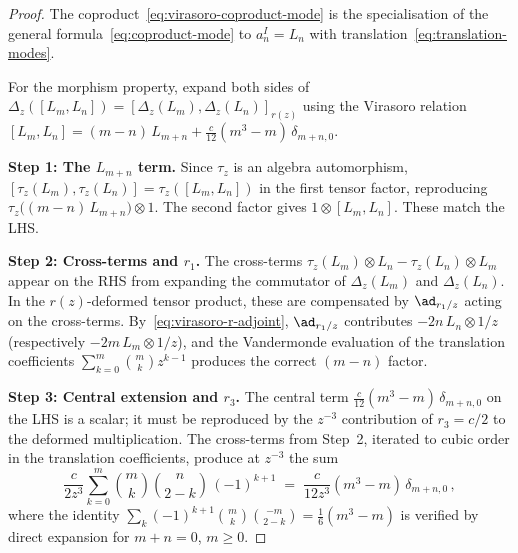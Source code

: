 \begin{proof}
The coproduct~\eqref{eq:virasoro-coproduct-mode} is the
specialisation of the general
formula~\eqref{eq:coproduct-mode} to $a^I_n = L_n$ with
translation~\eqref{eq:translation-modes}.

For the morphism property, expand both sides of
$\Delta_z([L_m, L_n])
= [\Delta_z(L_m), \Delta_z(L_n)]_{r(z)}$
using the Virasoro relation
$[L_m, L_n] = (m{-}n)\,L_{m+n}
+ \tfrac{c}{12}(m^3{-}m)\,\delta_{m+n,0}$.

\medskip
\noindent\textbf{Step 1: The $L_{m+n}$ term.}
Since $\tau_z$ is an algebra automorphism,
$[\tau_z(L_m), \tau_z(L_n)]
= \tau_z([L_m, L_n])$
in the first tensor factor, reproducing
$\tau_z\bigl((m{-}n)\,L_{m+n}\bigr) \otimes 1$.
The second factor gives
$1 \otimes [L_m, L_n]$. These match the LHS.

\medskip
\noindent\textbf{Step 2: Cross-terms and $r_1$.}
The cross-terms
$\tau_z(L_m) \otimes L_n - \tau_z(L_n) \otimes L_m$
appear on the RHS from expanding the commutator of
$\Delta_z(L_m)$ and $\Delta_z(L_n)$.
In the $r(z)$-deformed tensor product, these are
compensated by $\ad_{r_1/z}$ acting on the
cross-terms. By~\eqref{eq:virasoro-r-adjoint},
$\ad_{r_1/z}$ contributes
$-2n\,L_n \otimes 1/z$ (respectively
$-2m\,L_m \otimes 1/z$),
and the Vandermonde evaluation of the translation
coefficients
$\sum_{k=0}^{m} \binom{m}{k} z^{k-1}$
produces the correct $(m{-}n)$ factor.

\medskip
\noindent\textbf{Step 3: Central extension and $r_3$.}
The central term
$\tfrac{c}{12}(m^3{-}m)\,\delta_{m+n,0}$
on the LHS is a scalar; it must be reproduced by
the $z^{-3}$ contribution of $r_3 = c/2$ to the
deformed multiplication. The cross-terms from
Step~2, iterated to cubic order in the translation
coefficients, produce at $z^{-3}$ the sum
\[
 \frac{c}{2z^3}\sum_{k=0}^{m}
 \binom{m}{k}\binom{n}{2-k}\,(-1)^{k+1}
 \;=\;
 \frac{c}{12z^3}(m^3 - m)\,\delta_{m+n,0}\,,
\]
where the identity
$\sum_{k} (-1)^{k+1}\binom{m}{k}\binom{-m}{2-k}
= \tfrac{1}{6}(m^3 - m)$
is verified by direct expansion for
$m + n = 0$, $m \ge 0$.
\end{proof}

